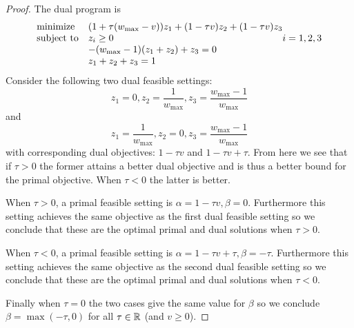 \begin{proof}
The dual program is
\begin{equation*}
\begin{array}{ll@{}ll}
\text{minimize}  & (1+\tau(w_{\max}-v))z_1 +(1-\tau v) z_2 + (1-\tau v) z_3 &\\
\text{subject to}& z_i \geq 0  & i=1,2,3 \\
                 & -(w_{\max}-1)(z_1+z_2)+z_3 = 0 \\
                 & z_1+z_2+z_3=1 \\
\end{array}
\end{equation*}
Consider the following two dual feasible settings:
\[
z_1=0,z_2=\frac{1}{w_{\max}}, z_3=\frac{w_{\max}-1}{w_{\max}}
\]
and 
\[
z_1=\frac{1}{w_{\max}}, z_2=0, z_3=\frac{w_{\max}-1}{w_{\max}}
\]
with corresponding dual objectives: $1-\tau v$ and $1-\tau v + \tau$. From here we see that if $\tau > 0$ the former attains a
better dual objective and is thus a better bound
for the primal objective. When $\tau<0$ the latter
is better. 

When $\tau>0$, a primal feasible setting is
$\alpha=1-\tau v,\beta=0$. Furthermore this setting
achieves the same objective as the first dual feasible setting so 
we conclude that these are the optimal primal and dual solutions when $\tau>0$.

When $\tau<0$, a primal feasible setting is 
$\alpha=1-\tau v +\tau, \beta=-\tau$. Furthermore this setting
achieves the same objective as the second dual feasible setting
so we conclude that these are the optimal primal and dual solutions when $\tau<0$. 

Finally when $\tau=0$ the two cases give the same value for $\beta$ so we conclude $\beta=\max(-\tau,0)$ for all $\tau \in \mathbb{R}$ (and $v\geq 0$).
\end{proof}

